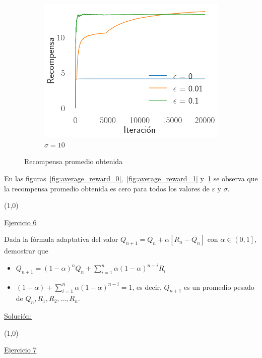 \documentclass[12pt]{article}
\newlength\tindent
\renewcommand{\indent}{\hspace*{\tindent}}
\begin{document}
\begin{figure}[H]
\begin{subfigure}[H]{0.3\textwidth}
            \includegraphics[width=\textwidth]{../img/reward_iteration_sigma_10}
            \caption{$\sigma=10$}
            \label{fig:average_reward_10}
        \end{subfigure}
        \caption{Recompensa promedio obtenida}
        \label{fig:average_reward}
    \end{figure}

    En las figuras~\ref{fig:average_reward_0},~\ref{fig:average_reward_1} y~\ref{fig:average_reward_10} se observa que la recompensa promedio obtenida es cero para todos los valores de $\varepsilon$ y $\sigma$.

    \line(1,0){\textwidth}

    \indent\underline{Ejercicio 6}

    Dada la fórmula adaptativa del valor $Q_{n+1}= Q_n+\alpha\left[R_{n}-Q_{n}\right]$ con $\alpha\in\left(0,1\right]$, demostrar que

    \begin{itemize}
        \item $Q_{n+1}=(1-\alpha)^{n}Q_{n} + \sum_{i=1}^n \alpha(1-\alpha)^{n-i}R_{i}$
        \item $(1-\alpha)+\sum_{i=1}^{n} \alpha(1-\alpha)^{n-i}=1$, es decir, $Q_{n+1}$ es un promedio pesado de $Q_{n},R_1,R_2,\dots,R_n$.
    \end{itemize}

    \indent\underline{Solución:}

    \lipsum[2]

    \line(1,0){\textwidth}

    \indent\underline{Ejercicio 7}
\end{document}
